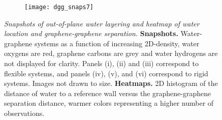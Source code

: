 \documentclass[12pt]{article}
\begin{document}
\begin{figure}[h!]
	\centering
	\begin{subfigure}[b]{0.99\textwidth}
    		\texttt{[image: dgg\_snaps7]}
  	\end{subfigure}
	\caption{\textit{Snapshots of out-of-plane water layering and heatmap of water location and graphene-graphene separation.} \textbf{Snapshots.} Water-graphene systems as a function of increasing 2D-density, water oxygens are red, graphene carbons are grey and water hydrogens are not displayed for clarity. Panels (i), (ii) and (iii) correspond to flexible systems, and panels (iv), (v), and (vi) correspond to rigid systems. Images not drawn to size. \textbf{Heatmaps.} 2D histogram of the distance of water to a reference wall versus the graphene-graphene separation distance, warmer colors representing a higher number of observations.}
	\label{fig:dgg_2}
\end{figure}
\end{document}
